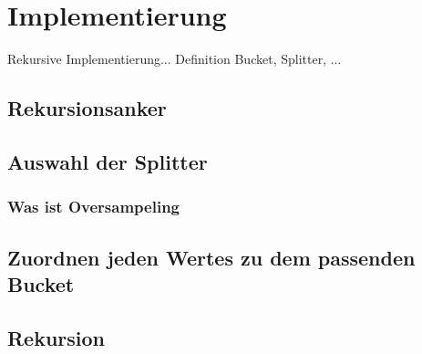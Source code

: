 \section{Implementierung}
Rekursive Implementierung...
Definition Bucket, Splitter, ...



\subsection{Rekursionsanker}

\subsection{Auswahl der Splitter}


\subsubsection{Was ist Oversampeling}

\subsection{Zuordnen jeden Wertes zu dem passenden Bucket}


\subsection{Rekursion}
